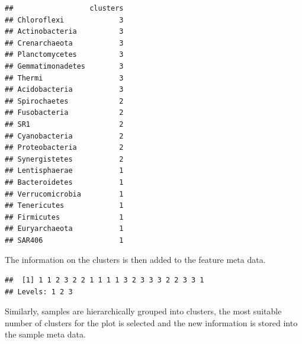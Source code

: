 \documentclass[
]{book}
\newenvironment{Shaded}{\begin{snugshade}}{\end{snugshade}}
\newcommand{\CommentTok}[1]{\textcolor[rgb]{0.56,0.35,0.01}{\textit{#1}}}
\newcommand{\FunctionTok}[1]{\textcolor[rgb]{0.00,0.00,0.00}{#1}}
\newcommand{\NormalTok}[1]{#1}
\newcommand{\OtherTok}[1]{\textcolor[rgb]{0.56,0.35,0.01}{#1}}
\newcommand{\SpecialCharTok}[1]{\textcolor[rgb]{0.00,0.00,0.00}{#1}}
\begin{document}
\begin{verbatim}
##                  clusters
## Chloroflexi             3
## Actinobacteria          3
## Crenarchaeota           3
## Planctomycetes          3
## Gemmatimonadetes        3
## Thermi                  3
## Acidobacteria           3
## Spirochaetes            2
## Fusobacteria            2
## SR1                     2
## Cyanobacteria           2
## Proteobacteria          2
## Synergistetes           2
## Lentisphaerae           1
## Bacteroidetes           1
## Verrucomicrobia         1
## Tenericutes             1
## Firmicutes              1
## Euryarchaeota           1
## SAR406                  1
\end{verbatim}

The information on the clusters is then added to the feature meta data.

\begin{Shaded}
\end{Shaded}

\begin{verbatim}
##  [1] 1 1 2 3 2 2 1 1 1 1 3 2 3 3 3 2 2 3 3 1
## Levels: 1 2 3
\end{verbatim}

Similarly, samples are hierarchically grouped into clusters, the most suitable
number of clusters for the plot is selected and the new information is stored
into the sample meta data.
\end{document}
